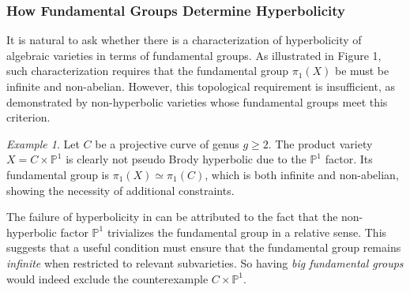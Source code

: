 \documentclass[english]{amsproc}
\theoremstyle{plain}
\theoremstyle{definition}
\theoremstyle{remark}
\newtheorem{example}[thm]{Example}
\theoremstyle{plain}
\numberwithin{equation}{thm} %
\begin{document}
\subsubsection{How Fundamental Groups Determine Hyperbolicity} 
It is natural to ask whether there is  a characterization of   hyperbolicity of algebraic varieties in terms of fundamental groups. 
As illustrated in Figure 1,   such characterization requires that the fundamental group $\pi_1(X)$ be must be  infinite and non-abelian.  However, this topological requirement is insufficient, as demonstrated by non-hyperbolic varieties whose fundamental groups meet this criterion. 
\begin{example} \label{example1}
	Let $C$ be a projective curve of genus $g \geq 2$. The product variety $X = C \times \mathbb{P}^1$ is clearly not pseudo Brody hyperbolic due to the $\mathbb{P}^1$ factor. Its fundamental group is $\pi_1(X) \simeq \pi_1(C)$, which is both infinite and non-abelian, showing the necessity of additional constraints.
\end{example} 
The failure of hyperbolicity in  can be attributed to the fact that the non-hyperbolic factor $\mathbb{P}^1$ trivializes the fundamental group in a relative sense. This suggests that a useful condition must ensure that the fundamental group remains \emph{infinite} when restricted to relevant subvarieties. So having \emph{big fundamental groups} would indeed exclude the counterexample $C \times \mathbb{P}^1$. 
\end{document}
